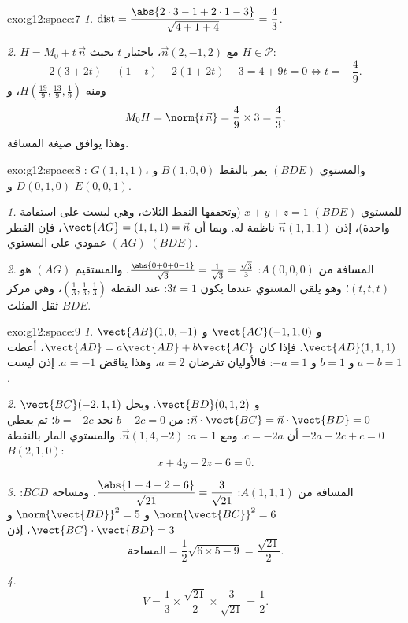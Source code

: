 \begin{solution}{exo:g12:space:7}
\emph{1.} $\operatorname{dist} = \dfrac{\abs{2\cdot3 - 1 + 2\cdot1 - 3}}
{\sqrt{4 + 1 + 4}} = \dfrac{4}{3}$.

\emph{2.} $H = M_0 + t\,\vec n$ مع $\vec n(2, -1, 2)$، باختيار $t$ بحيث
$H \in \mathcal P$:
\[
2(3 + 2t) - (1 - t) + 2(1 + 2t) - 3 = 4 + 9t = 0 \iff t = -\frac49 .
\]
ومنه $H\left(\frac{19}{9}, \frac{13}{9}, \frac19\right)$، و
\[
M_0H = \norm{t\,\vec n} = \frac49 \times 3 = \frac43,
\]
وهذا يوافق صيغة المسافة.
\end{solution}

\begin{solution}{exo:g12:space:8}
: $G(1,1,1)$، والمستوي $(BDE)$ يمر بالنقط $B(1,0,0)$
و $D(0,1,0)$ و $E(0,0,1)$.

\emph{1.} للمستوي $(BDE)$  $x + y + z = 1$ (وتحققها النقط
الثلاث، وهي ليست على استقامة واحدة)، إذن $\vec n(1,1,1)$ ناظمة
له. وبما أن $\vect{AG} = (1,1,1) = \vec n$، فإن القطر $(AG)$ عمودي
على المستوي $(BDE)$.

\emph{2.} المسافة من $A(0,0,0)$:
$\frac{\abs{0 + 0 + 0 - 1}}{\sqrt3} = \frac{1}{\sqrt3} = \frac{\sqrt3}{3}$.
والمستقيم $(AG)$ هو $(t, t, t)$؛ وهو يلقى المستوي عندما يكون $3t = 1$: عند
النقطة $\left(\frac13, \frac13, \frac13\right)$، وهي مركز ثقل
المثلث $BDE$.
\end{solution}

\begin{solution}{exo:g12:space:9}
\emph{1.} $\vect{AB}(1, 0, -1)$ و $\vect{AC}(-1, 1, 0)$
و $\vect{AD}(1, 1, 1)$. فإذا كان $\vect{AD} = a\vect{AB} + b\vect{AC}$، أعطت
 $a - b = 1$ و $b = 1$ و $-a = 1$: فالأوليان تفرضان
$a = 2$، وهذا يناقض $a = -1$. إذن ليست .

\emph{2.} $\vect{BC}(-2, 1, 1)$ و $\vect{BD}(0, 1, 2)$. وبحل
$\vec n \cdot \vect{BC} = \vec n \cdot \vect{BD} = 0$: من
$b + 2c = 0$ نجد $b = -2c$؛ ثم يعطي $-2a - 2c + c = 0$ أن $c = -2a$. ومع
$a = 1$: $\vec n(1, 4, -2)$. والمستوي المار بالنقطة $B(2,1,0)$:
\[
x + 4y - 2z - 6 = 0 .
\]

\emph{3.} المسافة من $A(1,1,1)$:
$\dfrac{\abs{1 + 4 - 2 - 6}}{\sqrt{21}} = \dfrac{3}{\sqrt{21}}$.
ومساحة $BCD$: $\norm{\vect{BC}}^2 = 6$ و $\norm{\vect{BD}}^2 = 5$
و $\vect{BC}\cdot\vect{BD} = 3$، إذن
\[
\text{المساحة} = \frac12\sqrt{6 \times 5 - 9} = \frac{\sqrt{21}}{2}.
\]

\emph{4.}
\[
V = \frac13 \times \frac{\sqrt{21}}{2} \times \frac{3}{\sqrt{21}}
= \frac12 .
\]
\end{solution}

